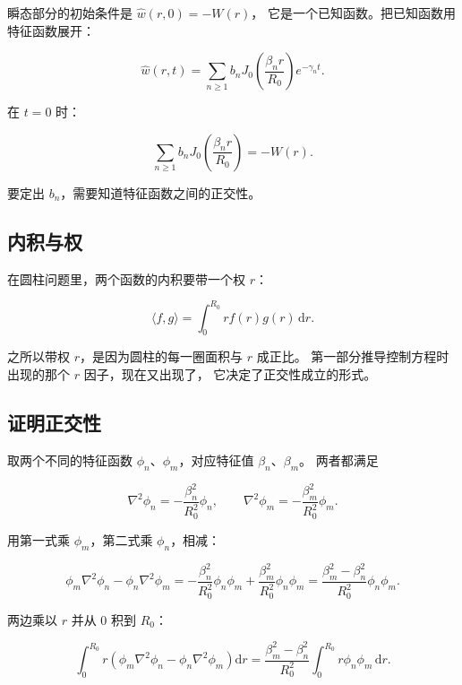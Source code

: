 瞬态部分的初始条件是 $\hat w(r,0)=-W(r)$，
它是一个已知函数。把已知函数用特征函数展开：

\begin{equation}
\hat w(r,t)=\sum_{n\ge1}b_n J_0\!\left(\frac{\beta_n r}{R_0}\right)e^{-\gamma_n t}.
\label{eq:p6-series}
\end{equation}

在 $t=0$ 时：

\begin{equation}
\sum_{n\ge1}b_n J_0\!\left(\frac{\beta_n r}{R_0}\right)=-W(r).
\label{eq:p6-series0}
\end{equation}

要定出 $b_n$，需要知道特征函数之间的正交性。

\subsection{内积与权}

在圆柱问题里，两个函数的内积要带一个权 $r$：

\begin{equation}
\langle f,g\rangle=\int_0^{R_0} r f(r)g(r)\,\mathrm{d}r .
\label{eq:p6-inner}
\end{equation}

之所以带权 $r$，是因为圆柱的每一圈面积与 $r$ 成正比。
第一部分推导控制方程时出现的那个 $r$ 因子，现在又出现了，
它决定了正交性成立的形式。

\subsection{证明正交性}

取两个不同的特征函数 $\phi_n$、$\phi_m$，对应特征值 $\beta_n$、$\beta_m$。
两者都满足

\begin{equation}
\nabla^2\phi_n=-\frac{\beta_n^2}{R_0^2}\phi_n,
\qquad
\nabla^2\phi_m=-\frac{\beta_m^2}{R_0^2}\phi_m .
\end{equation}

用第一式乘 $\phi_m$，第二式乘 $\phi_n$，相减：

\begin{equation}
\phi_m\nabla^2\phi_n-\phi_n\nabla^2\phi_m
=-\frac{\beta_n^2}{R_0^2}\phi_n\phi_m+\frac{\beta_m^2}{R_0^2}\phi_n\phi_m
=\frac{\beta_m^2-\beta_n^2}{R_0^2}\phi_n\phi_m .
\end{equation}

两边乘以 $r$ 并从 $0$ 积到 $R_0$：

\begin{equation}
\int_0^{R_0} r\left(\phi_m\nabla^2\phi_n-\phi_n\nabla^2\phi_m\right)\mathrm{d}r
=\frac{\beta_m^2-\beta_n^2}{R_0^2}\int_0^{R_0} r\phi_n\phi_m\,\mathrm{d}r .
\label{eq:p6-orth1}
\end{equation}

